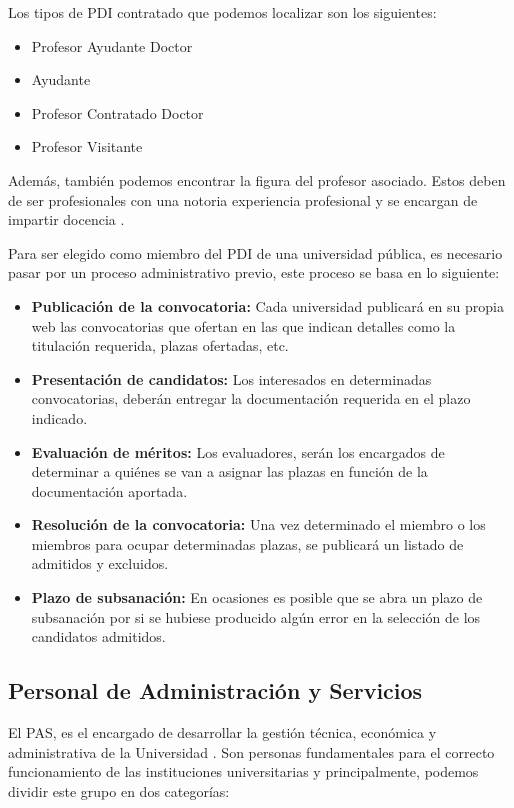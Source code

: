 Los tipos de PDI contratado que podemos localizar son los siguientes:

\begin{itemize}
    \item Profesor Ayudante Doctor
    \item Ayudante
    \item Profesor Contratado Doctor
    \item Profesor Visitante
\end{itemize}

Además, también podemos encontrar la figura del profesor asociado. Estos deben de ser profesionales con una  notoria experiencia profesional y se encargan de impartir docencia \cite{pdi:latex}. 

Para ser elegido como miembro del PDI de una universidad pública, es necesario pasar por un proceso administrativo previo, este proceso se basa en lo siguiente:

\begin{itemize}
    \item \textbf{Publicación de la convocatoria:} Cada universidad publicará en su propia web las convocatorias que ofertan en las que indican detalles como la titulación requerida, plazas ofertadas, etc.
    \item \textbf{Presentación de candidatos:} Los interesados en determinadas convocatorias, deberán entregar la documentación requerida en el plazo indicado.
    \item \textbf{Evaluación de méritos:} Los evaluadores, serán los encargados de determinar a quiénes se van a asignar las plazas en función de la documentación aportada.
    \item \textbf{Resolución de la convocatoria:} Una vez determinado el miembro o los miembros para ocupar determinadas plazas, se publicará un listado de admitidos y excluidos.
    \item \textbf{Plazo de subsanación:} En ocasiones es posible que se abra un plazo de subsanación por si se hubiese producido algún error en la selección de los candidatos admitidos.
\end{itemize}


\subsection{Personal de Administración y Servicios}

El PAS, es el encargado de desarrollar la gestión técnica, económica y administrativa de la Universidad \cite{raepas:latex}. Son personas fundamentales para el correcto funcionamiento de las instituciones universitarias y principalmente, podemos dividir este grupo en dos categorías:

